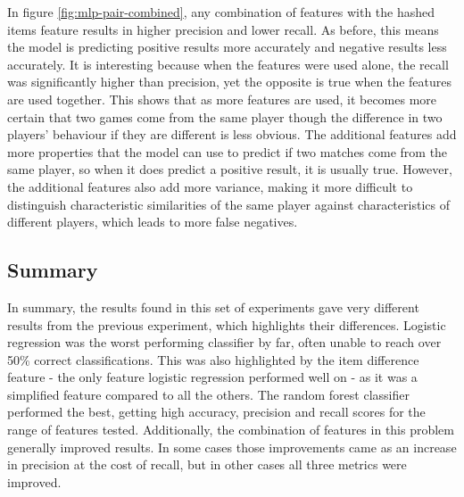 \documentclass[Report.tex]{subfiles}
\begin{document}
In figure \ref{fig:mlp-pair-combined}, any combination of features with the hashed items feature results in higher precision and lower recall. As before, this means the model is predicting positive results more accurately and negative results less accurately. It is interesting because when the features were used alone, the recall was significantly higher than precision, yet the opposite is true when the features are used together. This shows that as more features are used, it becomes more certain that two games come from the same player though the difference in two players' behaviour if they are different is less obvious. The additional features add more properties that the model can use to predict if two matches come from the same player, so when it does predict a positive result, it is usually true. However, the additional features also add more variance, making it more difficult to distinguish characteristic similarities of the same player against characteristics of different players, which leads to more false negatives. 




\subsection{Summary}
In summary, the results found in this set of experiments gave very different results from the previous experiment, which highlights their differences. Logistic regression was the worst performing classifier by far, often unable to reach over 50\% correct classifications. This was also highlighted by the item difference feature - the only feature logistic regression performed well on - as it was a simplified feature compared to all the others. The random forest classifier performed the best, getting high accuracy, precision and recall scores for the range of features tested. Additionally, the combination of features in this problem generally improved results. In some cases those improvements came as an increase in precision at the cost of recall, but in other cases all three metrics were improved. 


\end{document}
